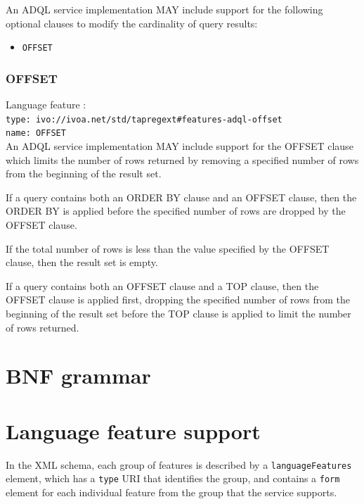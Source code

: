 \documentclass[11pt,a4paper]{ivoa}
\begin{document}
An ADQL service implementation MAY include support for the following optional
clauses to modify the cardinality of query results:

\begin{itemize}
    \item \verb:OFFSET:
\end{itemize}

\subsubsection{OFFSET}
\label{sec:offset}

{\footnotesize Language feature :}\\
{\footnotesize \verb|type: ivo://ivoa.net/std/tapregext#features-adql-offset|}\\
{\footnotesize \verb|name: OFFSET|}\\

An ADQL service implementation MAY include support for the OFFSET clause
which limits the number of rows returned by removing a specified number
of rows from the beginning of the result set.

If a query contains both an ORDER BY clause and an OFFSET clause,
then the ORDER BY is applied before the specified number of
rows are dropped by the OFFSET clause.

If the total number of rows is less than the value
specified by the OFFSET clause, then the result set is empty.

If a query contains both an OFFSET clause and a TOP clause,
then the OFFSET clause is applied first, dropping the specified
number of rows from the beginning of the result set before the
TOP clause is applied to limit the number of rows returned.

\clearpage %
\appendix
\section{BNF grammar}
\label{sec:grammar}



\clearpage %
\section{Language feature support}
\label{sec:features}

In the \TAPRegSpec{} XML schema, each group of features is
described by a \verb:languageFeatures: element, which has a \verb:type:
URI that identifies the group, and contains a \verb:form: element for each
individual feature from the group that the service supports.
\end{document}
